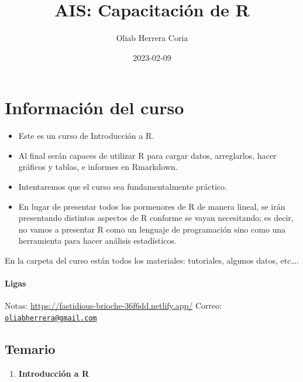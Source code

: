 \documentclass[
]{book}
\title{AIS: Capacitación de R}
\author{Oliab Herrera Coria}
\date{2023-02-09}
\providecommand{\tightlist}{%
  \setlength{\itemsep}{0pt}\setlength{\parskip}{0pt}}
\begin{document}
\maketitle

{
\setcounter{tocdepth}{1}
\tableofcontents
}
\hypertarget{informaciuxf3n-del-curso}{%
\chapter*{Información del curso}\label{informaciuxf3n-del-curso}}

\begin{itemize}
\item
  Este es un curso de Introducción a R.
\item
  Al final serán capaces de utilizar R para cargar datos, arreglarlos, hacer gráficos y tablas, e informes en Rmarkdown.
\item
  Intentaremos que el curso sea fundamentalmente práctico.
\item
  En lugar de presentar todos los pormenores de R de manera lineal, se irán presentando distintos aspectos de R conforme se vayan necesitando; es decir, no vamos a presentar R como un lenguaje de programación sino como una herramienta para hacer análisis estadísticos.
\end{itemize}

En la carpeta del curso están todos los materiales: tutoriales, algunos datos, etc\ldots.

\hypertarget{ligas}{%
\subsubsection*{Ligas}\label{ligas}}

Notas: \url{https://fastidious-brioche-36f6dd.netlify.app/}
Correo: \href{mailto:oliabherrera@gmail.com}{\nolinkurl{oliabherrera@gmail.com}}

\hypertarget{temario}{%
\section*{Temario}\label{temario}}

\begin{enumerate}
\def\labelenumi{\arabic{enumi}.}
\tightlist
\item
  \textbf{Introducción a R}
\end{enumerate}
\end{document}

